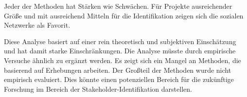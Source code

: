 \begin{table}[H]
\centering
{}
\end{table}

Jeder der Methoden hat Stärken wie Schwächen. Für Projekte ausreichender Größe und mit ausreichend Mitteln für die Identifikation zeigen sich die sozialen Netzwerke als Favorit.

Diese Analyse basiert auf einer rein theoretisch und subjektiven Einschätzung und hat damit starke Einschränkungen. Die Analyse müsste durch empirische Versuche ähnlich zu \cite{kelanti} ergänzt werden. Es zeigt sich ein Mangel an Methoden, die basierend auf Erhebungen arbeiten. Der Großteil der Methoden wurde nicht empirisch evaluiert. Dies könnte einen potenziellen Bereich für die zukünftige Forschung im Bereich der Stakeholder-Identifikation darstellen.
